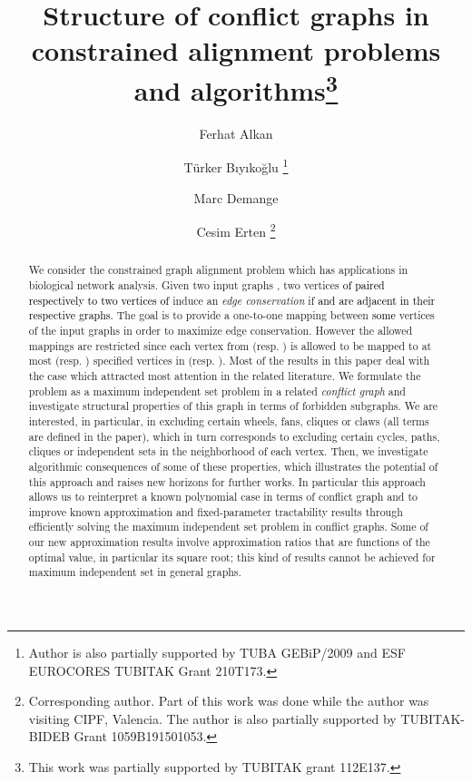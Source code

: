 \documentclass[final]{dmtcs-episciences}
\author{Ferhat Alkan\affiliationmark{1}
\and T\"{u}rker B{\i}y{\i}ko\u{g}lu\affiliationmark{2}
\thanks{Author is also partially supported by TUBA GEBiP/2009 and ESF EUROCORES TUBITAK Grant 210T173.}
\and Marc Demange\affiliationmark{3}
\and Cesim Erten\affiliationmark{4}
\thanks{Corresponding author. Part of this work was done while the author was visiting CIPF, Valencia. The author is also partially supported by TUBITAK-BIDEB Grant 1059B191501053.}}
\title{Structure of conflict graphs in constrained alignment  problems and algorithms\thanks{This work was partially supported by TUBITAK grant 112E137.}}
\affiliation{Division of Oncogenomics, The Netherlands Cancer Institute, Amsterdam, The Netherlands\\
2. Cadde, 12/9, 06500, Ankara, Turkey\\
School of  Science, RMIT University,
Melbourne, Australia\\
Computer Engineering, Antalya Bilim University, Antalya, Turkey}
\newcommand\mar[1]{\textcolor{black}{#1}}
\begin{document}




\maketitle

 \begin{abstract}
We consider the constrained graph alignment problem which has applications in biological network analysis. 
Given two input graphs , two vertices \mar{ of  paired respectively to two vertices  of }  induce an  \emph{ edge conservation} if \mar{ and  are adjacent in their respective graphs}. The goal is to provide a one-to-one mapping between \mar{some} vertices 
of the input graphs in order to maximize edge conservation. However the allowed mappings are restricted since each vertex from  (resp. ) is allowed to be mapped to at most  (resp. ) specified vertices in  (resp. ). Most of the results in this paper deal with the case  which attracted most attention in the related literature.
We formulate the problem as a maximum independent set problem in a related   {\em conflict graph} and investigate structural properties of this graph in terms of forbidden subgraphs. We are interested, in particular, in excluding certain wheels, fans, cliques or claws (all terms are defined in the paper), which in turn corresponds to excluding certain cycles, paths, cliques or independent sets in the neighborhood of each vertex. Then, we investigate algorithmic consequences  of some of these properties, which illustrates the potential of this approach and raises new horizons for further works. In particular this approach allows us to reinterpret a known polynomial case in terms of conflict graph and to improve known approximation and fixed-parameter tractability results through efficiently solving the maximum independent set problem in conflict graphs. Some of our new approximation results  involve  approximation ratios that are functions of the optimal value, in particular its square root; this  kind of results cannot be achieved for maximum independent set in general graphs.  
\end{abstract}

 
 
\end{document}

